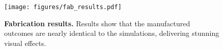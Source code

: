 \begin{figure}[t]
    \centering
    \texttt{[image: figures/fab\_results.pdf]}
    \setlength{\abovecaptionskip}{2pt} 
    \caption{\textbf{Fabrication results.} Results show that the manufactured outcomes are nearly identical to the simulations, delivering stunning visual effects.}
    \label{fig:fab}
\end{figure}
